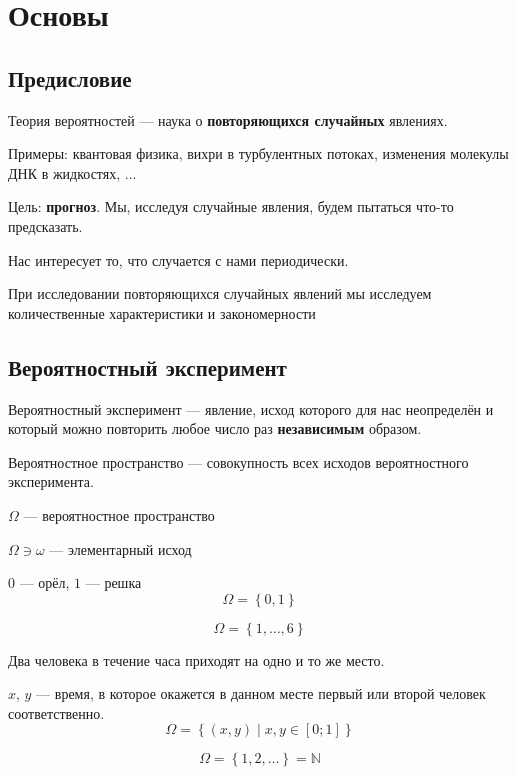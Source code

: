 \chapter{Основы}

\section{Предисловие}
Теория вероятностей --- наука о \textbf{повторяющихся случайных} явлениях.

Примеры: квантовая физика, вихри в турбулентных потоках, изменения молекулы ДНК в жидкостях, ...

Цель: \textbf{прогноз}. Мы, исследуя случайные явления, будем пытаться что-то предсказать.

Нас интересует то, что случается с нами периодически.

При исследовании повторяющихся случайных явлений мы исследуем количественные характеристики и закономерности

\section{Вероятностный эксперимент}
\begin{definition}
Вероятностный эксперимент --- явление, исход которого для нас неопределён и который можно повторить любое число раз \textbf{независимым} образом.
\end{definition}
\begin{definition}
Вероятностное пространство --- совокупность всех исходов вероятностного эксперимента.
\end{definition}
$\Omega$ --- вероятностное пространство

$\Omega \ni \omega$ --- элементарный исход

\begin{example}
$0$ --- орёл, $1$ --- решка
$$\Omega = \left\{ 0, 1 \right\}$$
\end{example}
\begin{example}
$$\Omega = \left\{ 1, \dots, 6 \right\}$$
\end{example}
\begin{example}
Два человека в течение часа приходят на одно и то же место.

$x$, $y$ --- время, в которое окажется в данном месте первый или второй человек соответственно.
$$\Omega = \left\{ \left(x,y\right) \mid x,y \in [0;1] \right\}$$
\end{example}
\begin{example}
$$\Omega = \left\{ 1,2, \dots \right\} =  \mathbb{N}$$
\end{example}
